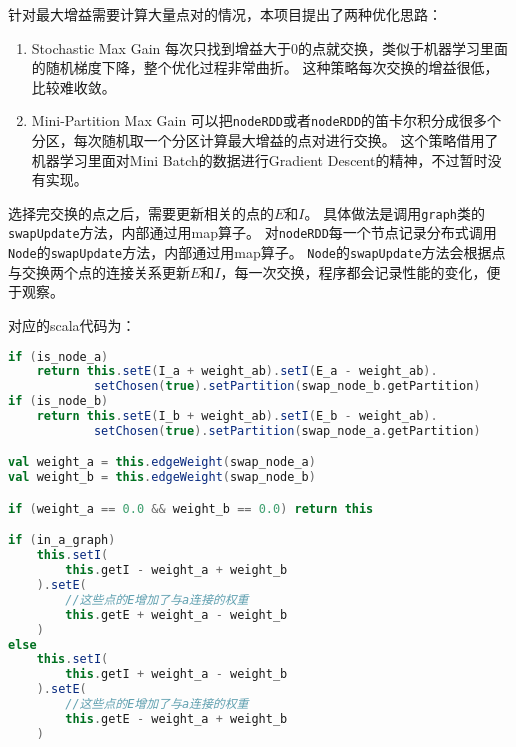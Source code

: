 针对最大增益需要计算大量点对的情况，本项目提出了两种优化思路：

\begin{enumerate}
    \item Stochastic Max Gain
    每次只找到增益大于$0$的点就交换，类似于机器学习里面的随机梯度下降，整个优化过程非常曲折。
    这种策略每次交换的增益很低，比较难收敛。

    \item Mini-Partition Max Gain
    可以把\texttt{nodeRDD}或者\texttt{nodeRDD}的笛卡尔积分成很多个分区，每次随机取一个分区计算最大增益的点对进行交换。
    这个策略借用了机器学习里面对Mini Batch的数据进行Gradient Descent的精神，不过暂时没有实现。
\end{enumerate}

选择完交换的点之后，需要更新相关的点的$E$和$I$。
具体做法是调用\texttt{graph}类的\texttt{swapUpdate}方法，内部通过用map算子。
对\texttt{nodeRDD}每一个节点记录分布式调用\texttt{Node}的\texttt{swapUpdate}方法，内部通过用map算子。
\texttt{Node}的\texttt{swapUpdate}方法会根据点与交换两个点的连接关系更新$E$和$I$，每一次交换，程序都会记录性能的变化，便于观察。



对应的scala代码为：

\begin{lstlisting}[language=Scala]
if (is_node_a)
    return this.setE(I_a + weight_ab).setI(E_a - weight_ab).
            setChosen(true).setPartition(swap_node_b.getPartition)
if (is_node_b)
    return this.setE(I_b + weight_ab).setI(E_b - weight_ab).
            setChosen(true).setPartition(swap_node_a.getPartition)

val weight_a = this.edgeWeight(swap_node_a)
val weight_b = this.edgeWeight(swap_node_b)

if (weight_a == 0.0 && weight_b == 0.0) return this

if (in_a_graph)
    this.setI(
        this.getI - weight_a + weight_b
    ).setE(
        //这些点的E增加了与a连接的权重
        this.getE + weight_a - weight_b
    )
else
    this.setI(
        this.getI + weight_a - weight_b
    ).setE(
        //这些点的E增加了与a连接的权重
        this.getE - weight_a + weight_b
    )
\end{lstlisting}

